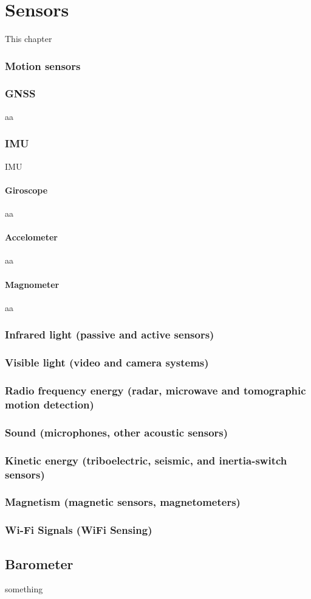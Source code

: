 \chapter{Sensors}
This chapter
\subsection{Motion sensors}
    \subsection{GNSS}
        aa
    \subsection{IMU}
        IMU
        \subsubsection{Giroscope}
            aa
        \subsubsection{Accelometer}
            aa
        \subsubsection{Magnometer}
            aa
    
    \subsection{Infrared light (passive and active sensors)}
    
    \subsection{Visible light (video and camera systems)}
    
    \subsection{Radio frequency energy (radar, microwave and tomographic motion detection)}
    
    \subsection{Sound (microphones, other acoustic sensors)}
    
    \subsection{Kinetic energy (triboelectric, seismic, and inertia-switch sensors)}
    
    \subsection{Magnetism (magnetic sensors, magnetometers)}
    
    \subsection{Wi-Fi Signals (WiFi Sensing)}
    
\section{Barometer}
    something